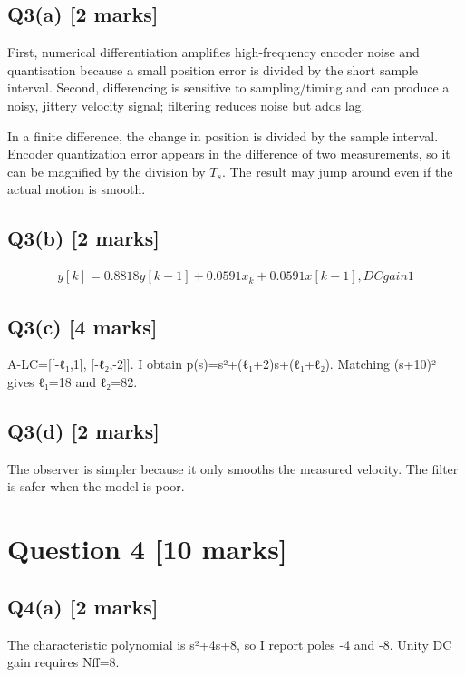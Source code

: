 \documentclass[11pt,a4paper]{article}
\begin{document}
\subsection*{Q3(a) \hfill [2 marks]}

First, numerical differentiation amplifies high-frequency encoder noise and quantisation because a small position error is divided by the short sample interval.
Second, differencing is sensitive to sampling/timing and can produce a noisy, jittery velocity signal; filtering reduces noise but adds lag.\par\smallskip In a finite difference, the change in position is divided by the sample interval. Encoder quantization error appears in the difference of two measurements, so it can be magnified by the division by $T_s$. The result may jump around even if the actual motion is smooth.

\subsection*{Q3(b) \hfill [2 marks]}

\[\begin{aligned}y[k]=0.8818y[k-1]+0.0591x_k+0.0591x[k-1], DC gain 1\end{aligned}\]

\subsection*{Q3(c) \hfill [4 marks]}

A-LC=[[-ℓ₁,1], [-ℓ₂,-2]].
I obtain p(s)=s²+(ℓ₁+2)s+(ℓ₁+ℓ₂).
Matching (s+10)² gives ℓ₁=18 and ℓ₂=82.

\subsection*{Q3(d) \hfill [2 marks]}

The observer is simpler because it only smooths the measured velocity.
The filter is safer when the model is poor.

\section*{Question 4 \hfill [10 marks]}
\subsection*{Q4(a) \hfill [2 marks]}

The characteristic polynomial is s²+4s+8, so I report poles -4 and -8.
Unity DC gain requires Nff=8.
\end{document}
